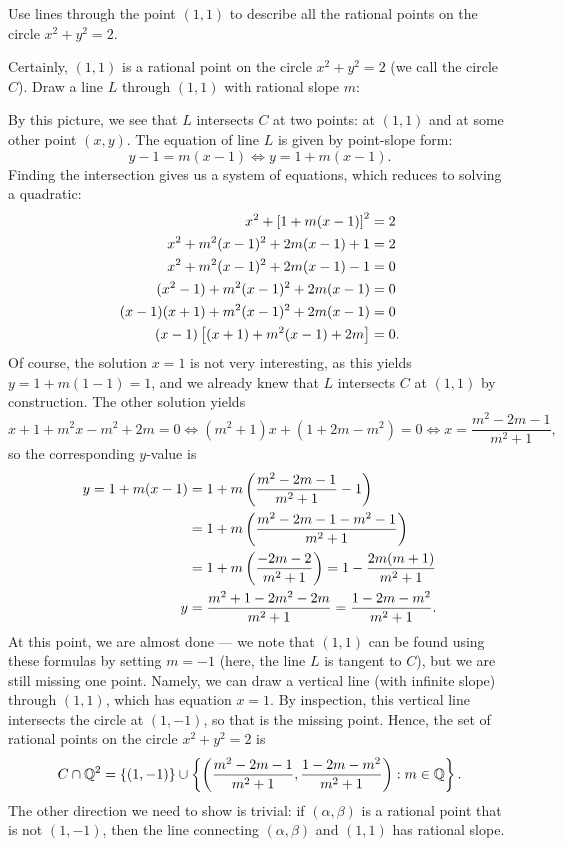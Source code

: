 \documentclass{article}
\begin{document}
\begin{exercise}[Chapter 3 \#2a]
Use lines through the point $(1,1)$ to describe all the rational points on the circle $x^2+y^2=2$.
\end{exercise}
\begin{solution}
Certainly, $(1,1)$ is a rational point on the circle $x^2+y^2=2$ (we call the circle $C$). Draw a line $L$ through $(1,1)$ with rational slope $m$:
\begin{center}
\end{center}
By this picture, we see that $L$ intersects $C$ at two points: at $(1,1)$ and at some other point $(x, y).$ The equation of line $L$ is given by point-slope form:
$$y-1 = m(x-1) \iff y = 1 + m(x-1).$$
Finding the intersection gives us a system of equations, which reduces to solving a quadratic:
\begin{align*}
x^2 + \left[1+m(x-1)\right]^2 &= 2 \\
x^2 + m^2(x-1)^2 + 2m(x-1) + 1 &= 2 \\
x^2 + m^2(x-1)^2 + 2m(x-1) - 1 &= 0 \\
(x^2-1) + m^2(x-1)^2 + 2m(x-1) &= 0 \\
(x-1)(x+1) + m^2(x-1)^2 + 2m(x-1) &= 0 \\
(x-1)\left[(x+1) + m^2(x-1) + 2m\right] &= 0.
\end{align*}
Of course, the solution $x=1$ is not very interesting, as this yields $y = 1 + m(1-1) = 1$, and we already knew that $L$ intersects $C$ at $(1,1)$ by construction. The other solution yields
$$x+1 + m^2x-m^2+2m=0 \iff (m^2+1)x + (1+2m-m^2) = 0\iff x = \frac{m^2-2m-1}{m^2+1},$$
so the corresponding $y$-value is
\begin{align*}
y = 1+m(x-1) &= 1 + m\left(\frac{m^2-2m-1}{m^2+1}-1 \right) \\
&= 1+ m\left(\frac{m^2-2m-1 - m^2-1}{m^2+1} \right) \\
&= 1 + m\left(\frac{-2m-2}{m^2+1} \right) = 1 - \frac{2m(m+1)}{m^2+1} \\
y &= \frac{m^2+1-2m^2-2m}{m^2+1} = \frac{1-2m-m^2}{m^2+1}.
\end{align*}
At this point, we are almost done --- we note that $(1,1)$ can be found using these formulas by setting $m=-1$ (here, the line $L$ is tangent to $C$), but we are still missing one point. Namely, we can draw a vertical line (with infinite slope) through $(1,1)$, which has equation $x=1$. By inspection, this vertical line intersects the circle at $(1, -1)$, so that is the missing point. Hence, the set of rational points on the circle $x^2+y^2=2$ is
$$C \cap \mathbb Q^2 = \{(1, -1)\}\cup \left\{\left(\frac{m^2-2m-1}{m^2+1}, \frac{1-2m-m^2}{m^2+1} \right): m\in\mathbb Q\right\}.$$
The other direction we need to show is trivial: if $(\alpha,\beta)$ is a rational point that is not $(1, -1)$, then the line connecting $(\alpha, \beta)$ and $(1,1)$ has rational slope.


\end{solution}
\end{document}
